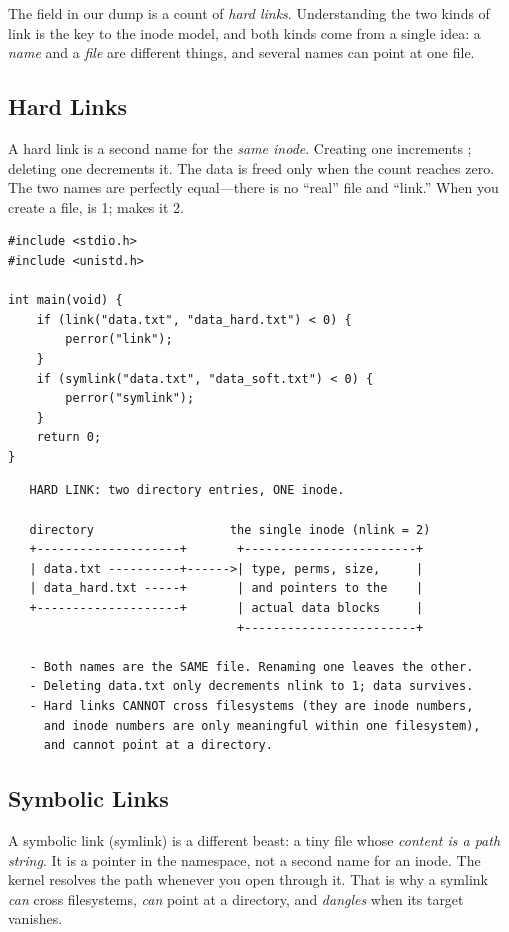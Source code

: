 The  field in our  dump is a count of
\emph{hard links}. Understanding the two kinds of link is the key to
the inode model, and both kinds come from a single idea: a \emph{name}
and a \emph{file} are different things, and several names can point at
one file.

\subsection{Hard Links}

A hard link is a second name for the \emph{same inode}. Creating one
increments ; deleting one decrements it. The data is
freed only when the count reaches zero. The two names are perfectly
equal---there is no ``real'' file and ``link.'' When you create a file,
 is 1;  makes it 2.

\begin{lstlisting}[caption={Creating both kinds of link.}]
#include <stdio.h>
#include <unistd.h>

int main(void) {
    if (link("data.txt", "data_hard.txt") < 0) {
        perror("link");
    }
    if (symlink("data.txt", "data_soft.txt") < 0) {
        perror("symlink");
    }
    return 0;
}
\end{lstlisting}

\begin{verbatim}
   HARD LINK: two directory entries, ONE inode.

   directory                   the single inode (nlink = 2)
   +--------------------+       +------------------------+
   | data.txt ----------+------>| type, perms, size,     |
   | data_hard.txt -----+       | and pointers to the    |
   +--------------------+       | actual data blocks     |
                                +------------------------+

   - Both names are the SAME file. Renaming one leaves the other.
   - Deleting data.txt only decrements nlink to 1; data survives.
   - Hard links CANNOT cross filesystems (they are inode numbers,
     and inode numbers are only meaningful within one filesystem),
     and cannot point at a directory.
\end{verbatim}

\subsection{Symbolic Links}

A symbolic link (symlink) is a different beast: a tiny file whose
\emph{content is a path string}. It is a pointer in the namespace, not
a second name for an inode. The kernel resolves the path whenever you
open through it. That is why a symlink \emph{can} cross filesystems,
\emph{can} point at a directory, and \emph{dangles} when its target
vanishes.

